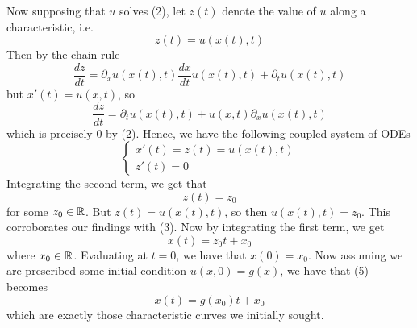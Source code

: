 \documentclass{myproject}
\begin{document}
Now supposing that $u$ solves (2), let $z(t)$ denote the value of $u$ along a characteristic, i.e. 
\[
    z(t) = u(x(t), t)
\]
Then by the chain rule
\[
    \frac{dz}{dt} = \partial_x u(x(t), t) \frac{dx}{dt}u(x(t), t) + \partial_t u(x(t), t)
\]
but $ x'(t) = u(x,t) $, so
\[
    \frac{dz}{dt} = \partial_t u(x(t), t) + u(x,t)\partial_x u(x(t), t)
\]
which is precisely 0 by (2). Hence, we have the following coupled system of ODEs
\begin{equation}
    \begin{cases}
        x'(t) = z(t) = u(x(t), t) \\
        z'(t) = 0
    \end{cases}
\end{equation}
Integrating the second term, we get that
\[
    z(t) = z_0
\]
for some $ z_0 \in \operatorname{\mathbb{R}} $. But $z(t) = u(x(t), t)$, so then $u(x(t), t) = z_0$. This corroborates our findings with (3). Now by integrating the first term, we get
\begin{equation}
    x(t) = z_0t + x_0
\end{equation}
where $ x_0 \in \operatorname{\mathbb{R}} $. Evaluating at $t=0$, we have that $x(0) = x_0$. Now assuming we are prescribed some initial condition $u(x,0) = g(x)$, we have that (5) becomes
\begin{equation}
    x(t) = g(x_0)t + x_0
\end{equation}
which are exactly those characteristic curves we initially sought.

\nocite{choksi2022}
\nocite{iserles2009}
\nocite{leveque1992}
\nocite{leveque2002}
\printbibliography
\end{document}
